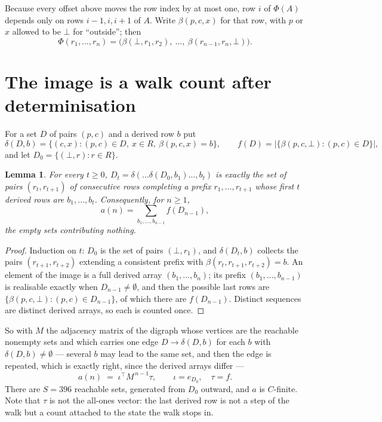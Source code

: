 \documentclass[11pt,a4paper]{article}
\theoremstyle{plain}
\newtheorem{lemma}[theorem]{Lemma}
\theoremstyle{definition}
\begin{document}
Because every offset above moves the row index by at most one, row $i$ of
$\Phi(A)$ depends only on rows $i-1,i,i+1$ of $A$. Write $\beta(p,c,x)$ for that row, with $p$
or $x$ allowed to be $\bot$ for ``outside''; then
\[
\Phi(r_1,\dots,r_n)=\bigl(\beta(\bot,r_1,r_2),\ \dots,\ \beta(r_{n-1},r_n,\bot)\bigr).
\]

\section{The image is a walk count after determinisation}

For a set $D$ of pairs $(p,c)$ and a derived row $b$ put
\[
\delta(D,b)=\{(c,x):(p,c)\in D,\ x\in R,\ \beta(p,c,x)=b\},\qquad
f(D)=\bigl|\{\beta(p,c,\bot):(p,c)\in D\}\bigr| ,
\]
and let $D_0=\{(\bot,r):r\in R\}$.

\begin{lemma}\label{lem:det}
For every $t\ge0$, $D_t=\delta(\dots\delta(D_0,b_1)\dots,b_t)$ is exactly the set of pairs
$(r_t,r_{t+1})$ of consecutive rows completing a prefix $r_1,\dots,r_{t+1}$ whose first $t$
derived rows are $b_1,\dots,b_t$. Consequently, for $n\ge1$,
\[
a(n)=\sum_{b_1,\dots,b_{n-1}}f(D_{n-1}),
\]
the empty sets contributing nothing.
\end{lemma}

\begin{proof}
Induction on $t$: $D_0$ is the set of pairs $(\bot,r_1)$, and $\delta(D_t,b)$ collects the
pairs $(r_{t+1},r_{t+2})$ extending a consistent prefix with
$\beta(r_t,r_{t+1},r_{t+2})=b$. An element of the image is a full derived array
$(b_1,\dots,b_n)$; its prefix $(b_1,\dots,b_{n-1})$ is realisable exactly when
$D_{n-1}\neq\emptyset$, and then the possible last rows are
$\{\beta(p,c,\bot):(p,c)\in D_{n-1}\}$, of which there are $f(D_{n-1})$. Distinct sequences
are distinct derived arrays, so each is counted once.
\end{proof}

So with $M$ the adjacency matrix of the digraph whose vertices are the reachable nonempty sets
and which carries one edge $D\to\delta(D,b)$ for each $b$ with $\delta(D,b)\neq\emptyset$ ---
several $b$ may lead to the same set, and then the edge is repeated, which is exactly right,
since the derived arrays differ ---
\[
a(n)\;=\;\iota^{\!\top}M^{\,n-1}\tau,\qquad \iota=e_{D_0},\quad \tau=f .
\]
There are $S=396$ reachable sets, generated from $D_0$ outward, and $a$ is $C$-finite.
Note that $\tau$ is not the all-ones vector: the last derived row is not a
step of the walk but a count attached to the state the walk stops in.
\end{document}
